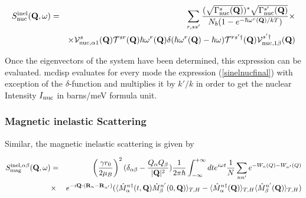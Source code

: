\begin{eqnarray}\label{sinelnucfinal}
S_{\rm nuc}^{\rm inel}(\mathbf Q,\omega)&=&
\sum_{r,ss'}  
\frac{(\sqrt{\Gamma_{\rm nuc}^s(\mathbf Q)})^\ast\sqrt{\Gamma_{\rm nuc}^{s'}(\mathbf Q)}}
{N_b(1-e^{-\hbar{\omega^r}(\mathbf Q)/kT})} \times \\ \nonumber
&& \times \mathcal V^s_{{\rm nuc},\alpha1}(\mathbf Q)
{ \mathcal T^{sr}}(\mathbf Q)\hbar {\omega^r}(\mathbf Q)
 \delta(\hbar {\omega^r}(\mathbf Q) - 
\hbar \omega) {\mathcal T^{rs'\dag}}(\mathbf Q) 
\mathcal V^{s'\dag}_{{\rm nuc},1\beta}(\mathbf Q)
\end{eqnarray}

Once the eigenvectors  of the system have been determined, this expression can be 
 evaluated. {\prg mcdisp} evaluates for every mode the expression (\ref{sinelnucfinal}) with exception
of the $\delta$-function and multiplies it by $k'/k$ in order to get the nuclear Intensity $I_{\rm nuc}$ in
barns/meV formula unit.

\subsubsection{Magnetic inelastic Scattering}

Similar, the magnetic inelastic scattering is given by




\begin{eqnarray}\label{Sinel}
S_{\rm mag}^{\rm inel,\alpha\beta}(\mathbf Q,\omega)&=&\left( \frac{ \gamma r_0}{2 \mu_B}  \right)^2
(\delta_{\alpha\beta}- \frac{Q_{\alpha} Q_{\beta}}{|\mathbf Q|^2}) 
\frac{1}{2\pi\hbar}\int_{-\infty}^{+\infty}dt e^{i\omega t}
\frac{1}{N}\sum_{nn'} e^{-W_n(Q)- W_{n'}(Q)}\\
&\times&  e^{-i\mathbf Q \cdot (\mathbf R_n-\mathbf R_{n'})}   (\langle \hat M_{\alpha}^{n \dag}(t,\mathbf Q)  \hat M_{\beta}^{n'}(0,\mathbf Q) \rangle_{T,H}
- \langle \hat M^{n \dag}_{\alpha}(\mathbf Q)\rangle_{T,H} \langle \hat M^{n'}_{\beta}(\mathbf Q) \rangle_{T,H})\nonumber
\end{eqnarray}

